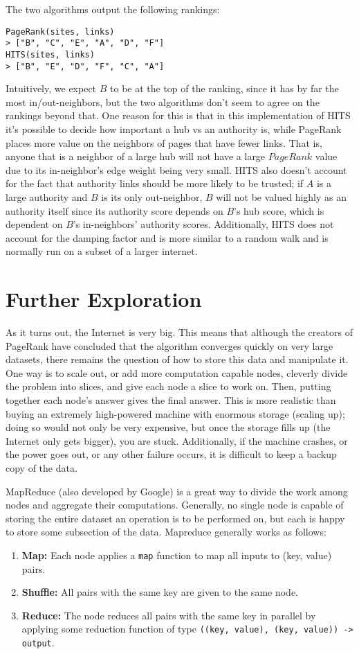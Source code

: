 \documentclass{article}
\begin{document}
The two algorithms output the following rankings:
\begin{verbatim}
PageRank(sites, links)
> ["B", "C", "E", "A", "D", "F"]
HITS(sites, links)
> ["B", "E", "D", "F", "C", "A"]
\end{verbatim}

Intuitively, we expect $B$ to be at the top of the ranking, since it has by far the most in/out-neighbors, but the two algorithms don't seem to agree on the rankings beyond that. One reason for this is that in this implementation of HITS it's possible to decide how important a hub vs an authority is, while PageRank places more value on the neighbors of pages that have fewer links. That is, anyone that is a neighbor of a large hub will not have a large $PageRank$ value due to its in-neighbor's edge weight being very small. HITS also doesn't account for the fact that authority links should be more likely to be trusted; if $A$ is a large authority and $B$ is its only out-neighbor, $B$ will not be valued highly as an authority itself since its authority score depends on $B$'s hub score, which is dependent on $B$'s in-neighbors' authority scores. Additionally, HITS does not account for the damping factor and is more similar to a random walk and is normally run on a subset of a larger internet.

\section{Further Exploration}
As it turns out, the Internet is very big. This means that although the creators of PageRank have concluded that the algorithm converges quickly on very large datasets, there remains the question of how to store this data and manipulate it. One way is to scale out, or add more computation capable nodes, cleverly divide the problem into slices, and give each node a slice to work on. Then, putting together each node's answer gives the final answer. This is more realistic than buying an extremely high-powered machine with enormous storage (scaling up); doing so would not only be very expensive, but once the storage fills up (the Internet only gets bigger), you are stuck. Additionally, if the machine crashes, or the power goes out, or any other failure occurs, it is difficult to keep a backup copy of the data.

MapReduce (also developed by Google) is a great way to divide the work among nodes and aggregate their computations. Generally, no single node is capable of storing the entire dataset an operation is to be performed on, but each is happy to store some subsection of the data. Mapreduce generally works as follows:
\begin{enumerate}
    \item \textbf{Map:} Each node applies a \texttt{map} function to map all inputs to (key, value) pairs.
    \item \textbf{Shuffle:} All pairs with the same key are given to the same node.
    \item \textbf{Reduce:} The node reduces all pairs with the same key in parallel by applying some reduction function of type \texttt{((key, value), (key, value)) -> output}.
\end{enumerate}
\end{document}
